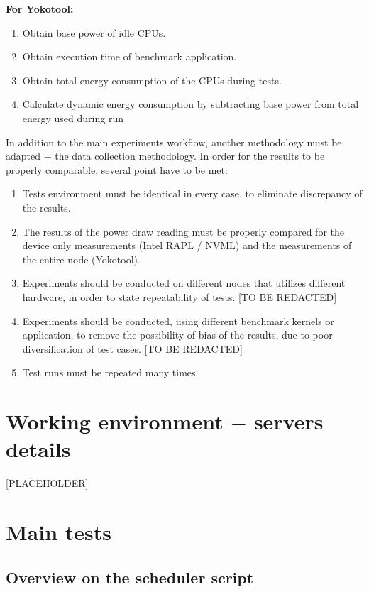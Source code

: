 \textbf{For Yokotool:}
\begin{enumerate}
    \item Obtain base power of idle CPUs.
    \item Obtain execution time of benchmark application.
    \item Obtain total energy consumption of the CPUs during tests.
    \item Calculate dynamic energy consumption by subtracting base power from
    total energy used during run
\end{enumerate}

\newpage

In addition to the main experiments workflow, another methodology must be
adapted $-$ the data collection methodology. In order for the results to be
properly comparable, several point have to be met:
\begin{enumerate}
    \item Tests environment must be identical in every case, to eliminate
    discrepancy of the results.
    \item The results of the power draw reading must be properly compared for
    the device only measurements (Intel RAPL / NVML) and the measurements of
    the entire node (Yokotool).
    \item Experiments should be conducted on different nodes that utilizes
    different hardware, in order to state repeatability of tests. [TO BE REDACTED]
    \item Experiments should be conducted, using different benchmark kernels
    or application, to remove the possibility of bias of the results, due to
    poor diversification of test cases. [TO BE REDACTED]
    \item Test runs must be repeated many times.
\end{enumerate}

\section{Working environment $-$ servers details}

[PLACEHOLDER]

\section{Main tests}

\subsection{Overview on the scheduler script}

